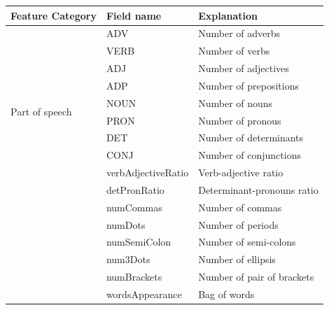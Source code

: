 \begin{table}[h]
	\begin{tabular}{|l|ll|}
		\hline
		\multicolumn{1}{|c|}{Feature Category} & \multicolumn{1}{l}{Field name} & \multicolumn{1}{l|}{Explanation}                    \\ \hline
		\multirow{10}{*}{Part of speech}       & ADV                            & Number of adverbs                                   \\ \cline{2-3} 
		& VERB                           & Number of verbs                                     \\ \cline{2-3} 
		& ADJ                            & Number of adjectives                                \\ \cline{2-3} 
		& ADP                            & Number of prepositions                              \\ \cline{2-3} 
		& NOUN                           & Number of nouns                                     \\ \cline{2-3} 
		& PRON                           & Number of pronous                                   \\ \cline{2-3} 
		& DET                            & Number of determinants                              \\ \cline{2-3} 
		& CONJ                           & Number of conjunctions                              \\ \cline{2-3} 
		& verbAdjectiveRatio             & Verb-adjective ratio                                \\ \cline{2-3} 
		& detPronRatio                   & Determinant-pronouns ratio                          \\ \hhline{|=|=|=|}
		\multirow{5}{*}{Punctuation}           & numCommas                      & Number of commas                                    \\ \cline{2-3} 
		& numDots                        & Number of periods                                   \\ \cline{2-3} 
		& numSemiColon                   & Number of semi-colons                               \\ \cline{2-3} 
		& num3Dots                       & Number of ellipsis                                  \\ \cline{2-3} 
		& numBrackets                    & Number of pair of brackets                          \\ \hhline{|=|=|=|}
		\multirow{11}{*}{Vocabulary}           & wordsAppearance                & Bag of words                                        \\ \cline{2-3} 

\end{tabular}
\end{table}
